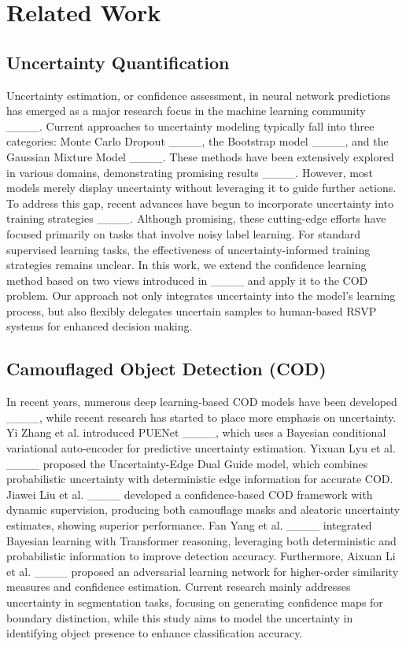 \section{Related Work}
\subsection{Uncertainty Quantification}
Uncertainty estimation, or confidence assessment, in neural network predictions has emerged as a major research focus in the machine learning community ____. Current approaches to uncertainty modeling typically fall into three categories: Monte Carlo Dropout ____, the Bootstrap model ____, and the Gaussian Mixture Model ____. These methods have been extensively explored in various domains, demonstrating promising results ____. However, most models merely display uncertainty without leveraging it to guide further actions. To address this gap, recent advances have begun to incorporate uncertainty into training strategies ____. Although promising, these cutting-edge efforts have focused primarily on tasks that involve noisy label learning. For standard supervised learning tasks, the effectiveness of uncertainty-informed training strategies remains unclear. In this work, we extend the confidence learning method based on two views introduced in ____ and apply it to the COD problem. Our approach not only integrates uncertainty into the model's learning process, but also flexibly delegates uncertain samples to human-based RSVP systems for enhanced decision making.

\subsection{Camouflaged Object Detection (COD)}
In recent years, numerous deep learning-based COD models have been developed ____, while recent research has started to place more emphasis on uncertainty. Yi Zhang et al. introduced PUENet ____, which uses a Bayesian conditional variational auto-encoder for predictive uncertainty estimation. Yixuan Lyu et al. ____ proposed the Uncertainty-Edge Dual Guide model, which combines probabilistic uncertainty with deterministic edge information for accurate COD. Jiawei Liu et al. ____ developed a confidence-based COD framework with dynamic supervision, producing both camouflage masks and aleatoric uncertainty estimates, showing superior performance. Fan Yang et al. ____ integrated Bayesian learning with Transformer reasoning, leveraging both deterministic and probabilistic information to improve detection accuracy. Furthermore, Aixuan Li et al. ____ proposed an adversarial learning network for higher-order similarity measures and confidence estimation. Current research mainly addresses uncertainty in segmentation tasks, focusing on generating confidence maps for boundary distinction, while this study aims to model the uncertainty in identifying object presence to enhance classification accuracy.

